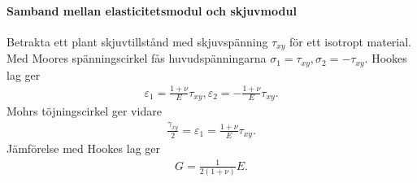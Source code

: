 \paragraph{Samband mellan elasticitetsmodul och skjuvmodul}
Betrakta ett plant skjuvtillstånd med skjuvspänning $\tau_{xy}$ för ett isotropt material. Med Moores spänningscirkel fås huvudspänningarna $\sigma_{1} = \tau_{xy}, \sigma_{2} = -\tau_{xy}$. Hookes lag ger
\begin{align*}
	\varepsilon_{1} = \frac{1 + \nu}{E}\tau_{xy}, \varepsilon_{2} = -\frac{1 + \nu}{E}\tau_{xy}.
\end{align*}
Mohrs töjningscirkel ger vidare
\begin{align*}
	\frac{\gamma_{xy}}{2} = \varepsilon_{1} = \frac{1 + \nu}{E}\tau_{xy}.
\end{align*}
Jämförelse med Hookes lag ger
\begin{align*}
	G = \frac{1}{2(1 + \nu)}E.
\end{align*}